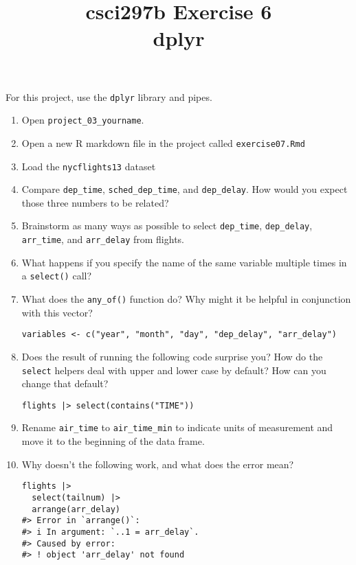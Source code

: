 \documentclass[12pt]{article}
\title{csci297b Exercise 6\\dplyr
  }
\date{}
\begin{document}
\maketitle

For this project, use the {\tt dplyr} library and pipes.

\begin{enumerate}

\item Open
\verb|project_03_yourname|.  


\item Open a new R markdown file in the project called \verb|exercise07.Rmd|

\item Load the {\tt nycflights13} dataset

\item  Compare \verb|dep_time|, 
\verb|sched_dep_time|, and 
\verb|dep_delay|. How would you expect those three numbers to be related?

\item
Brainstorm as many ways as possible to select \verb|dep_time|, 
\verb|dep_delay|, \verb|arr_time|, and \verb|arr_delay| from flights.

\item

What happens if you specify the name of the same variable multiple times in a 
\verb|select()| call?

\item
What does the \verb|any_of()| function do? Why might it be helpful in conjunction with this vector?
\begin{verbatim}
variables <- c("year", "month", "day", "dep_delay", "arr_delay")
\end{verbatim}

\item
Does the result of running the following code surprise you? How do the \verb|select|
helpers deal with upper and lower case by default? How can you change that default?

\begin{verbatim}
flights |> select(contains("TIME"))
\end{verbatim}

\item
Rename \verb|air_time| to \verb|air_time_min| to indicate units of measurement and move it to the beginning of the data frame.

\item

Why doesn’t the following work, and what does the error mean?
\begin{verbatim}
flights |> 
  select(tailnum) |> 
  arrange(arr_delay)
#> Error in `arrange()`:
#> i In argument: `..1 = arr_delay`.
#> Caused by error:
#> ! object 'arr_delay' not found
\end{verbatim}

\end{enumerate}
\end{document}
